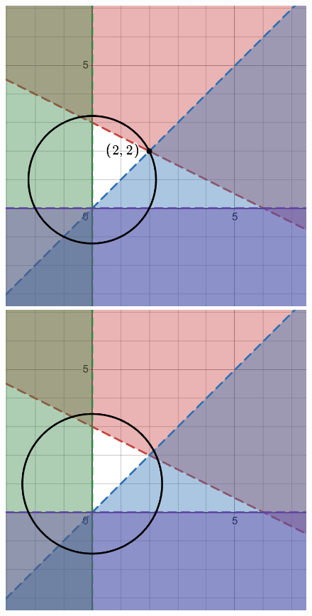 \documentclass[11pt]{article}
\begin{document}
\begin{enumerate}[leftmargin=*, itemsep=1.5em]
\begin{figure}[H]
    \vspace{0.5em}
    
    \begin{minipage}[t]{0.48\textwidth}
        \centering
        \includegraphics[width=\textwidth]{figures/HW1_a-5.png}
    \end{minipage}
    \hfill
    \begin{minipage}[t]{0.48\textwidth}
        \centering
        \includegraphics[width=\textwidth]{figures/HW1_a-6.png}
    \end{minipage}
    

\end{figure}
\end{enumerate}
\end{document}
